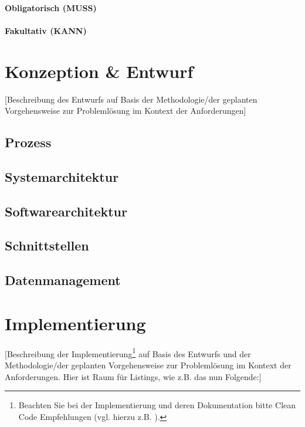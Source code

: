 \documentclass[oneside,bibliography=totocnumbered,BCOR=5mm]{scrbook}
\begin{document}
\subsubsection{Obligatorisch (MUSS)}

\subsubsection{Fakultativ (KANN)}

\chapter{Konzeption \& Entwurf}
[Beschreibung des Entwurfs auf Basis der Methodologie/der geplanten Vorgehensweise zur Problemlösung im Kontext der Anforderungen]

\section{Prozess}

\section{Systemarchitektur}

\section{Softwarearchitektur}

\section{Schnittstellen}

\section{Datenmanagement}


\chapter{Implementierung}
[Beschreibung der Implementierung\footnote{Beachten Sie bei der Implementierung und deren Dokumentation bitte Clean Code Empfehlungen (vgl. hierzu z.B. \cite{martin2008}).} auf Basis des Entwurfs und der Methodologie/der geplanten Vorgehensweise zur Problemlösung im Kontext der Anforderungen. Hier ist Raum für Listings, wie z.B. das nun Folgende:]
\end{document}
